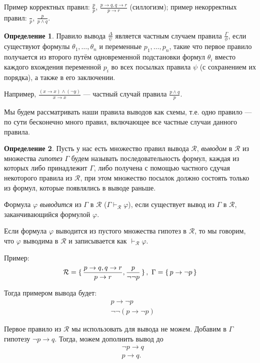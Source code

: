 \documentclass[12pt]{article}
\let\im\rightarrow
\let\n\neg
\let\ds\displaystyle
\theoremstyle{definition}
\newtheorem{definition}{Определение}[section]
\theoremstyle{statement}
\theoremstyle{theorem}
\begin{document}
Пример корректных правил: $\ds \frac{p}{p}$, $\ds \frac{p \im q, q
\im r}{p \im r}$ (силлогизм); пример некорректных правил: $\ds
\frac{}{p}$, $\ds \frac{p}{p \land q}$.

\begin{definition}
  Правило вывода $\ds\frac{\Delta}{\psi}$ является частным случаем
  правила $\ds\frac{\Gamma}{\phi}$, если существуют формулы $\theta_1,
  \dots, \theta_n$ и переменные $p_1, \dots, p_n$, такие что первое
  правило получается из второго путём одновременной подстановки
  формул $\theta_i$ вместо каждого вхождения переменной $p_i$ во всех
  посылках правила $\psi$ (с сохранением их порядка), а также в его заключении.
\end{definition}

Например, $\ds\frac{(x \im x) \land (\n y)}{x \im x}$ --- частный
случай правила $\ds\frac{p \land q}{p}$.

Мы будем рассматривать наши правила выводов как схемы, т.е. одно
правило --- по сути бесконечно много правил, включающее все частные
случаи данного правила.

\begin{definition}
  Пусть у нас есть множество правил вывода $\mathcal{R}$,
  \textit{выводом} в $\mathcal{R}$ из множества \textit{гипотез}
  $\Gamma$ будем называть последовательность формул, каждая из
  которых либо принадлежит $\Gamma$, либо получена с помощью частного
  сдучая некоторого правила из $\mathcal{R}$, при этом множество
  посылок должно состоять только из формул, которые появлялись в выводе раньше.

  Формула $\varphi$ \textit{выводится} из $\Gamma$ в $\mathcal{R}$
  ($\Gamma \vdash_{\mathcal{R}} \varphi$), если существует вывод из
  $\Gamma$ в $\mathcal{R}$, заканчивающийся формулой $\varphi$.

  Если формула $\varphi$ выводится из пустого множества гипотез в
  $\mathcal{R}$, то мы говорим, что $\varphi$ выводима в
  $\mathcal{R}$ и записывается как $\vdash_{\mathcal{R}} \varphi$.
\end{definition}

Пример:
\[
  \mathcal{R} = \set{\frac{p \im q, q \im r}{p \im r}, \frac{p}{\n\n
  p}},\ \Gamma = \set{p \im \n p}
\]

Тогда примером вывода будет:
\begin{align*}
  &p \im \n p\\
  &\n\n(p \im \n p)
\end{align*}

Первое правило из $\mathcal{R}$ мы использовать для вывода не можем.
Добавим в $\Gamma$ гипотезу $\n p \im q$. Тогда, можем дополнить вывод до
\begin{align*}
  &\n p \im q\\
  &p \im q.
\end{align*}
\end{document}
